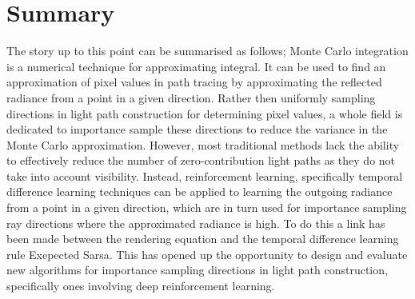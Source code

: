 \documentclass[../dissertation.tex]{subfiles}
\begin{document}
\section*{Summary}
The story up to this point can be summarised as follows; Monte Carlo integration is a numerical technique for approximating integral. It can be used to find an approximation of pixel values in path tracing by approximating the reflected radiance from a point in a given direction. Rather then uniformly sampling directions in light path construction for determining pixel values, a whole field is dedicated to importance sample these directions to reduce the variance in the Monte Carlo approximation. However, most traditional methods lack the ability to effectively reduce the number of zero-contribution light paths as they do not take into account visibility. Instead, reinforcement learning, specifically temporal difference learning techniques can be applied to learning the outgoing radiance from a point in a given direction, which are in turn used for importance sampling ray directions where the approximated radiance is high. To do this a link has been made between the rendering equation and the temporal difference learning rule Exepected Sarsa. This has opened up the opportunity to design and evaluate new algorithms for importance sampling directions in light path construction, specifically ones involving deep reinforcement learning.

\end{document}
